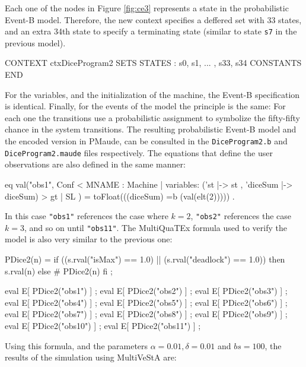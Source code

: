 Each one of the nodes in Figure \ref{fig:ce3} represents a state in the probabilistic Event-B model. Therefore, the new context specifies a deffered set with 33 states, and an extra 34th state to specify a terminating state (similar to state \texttt{s7} in the previous model).
\begin{maude}

CONTEXT ctxDiceProgram2
SETS 
    STATES : { s0, s1, ... , s33, s34 }
CONSTANTS 
END
\end{maude}
For the variables, and the initialization of the machine, the Event-B specification is identical. Finally, for the events of the model the principle is the same: For each one the transitions use a probabilistic assignment to symbolize the fifty-fifty chance in the system transitions. The resulting probabilistic Event-B model and the encoded version in PMaude, can be consulted in the \texttt{DiceProgram2.b} and \texttt{DiceProgram2.maude} files respectively. The equations that define the user observations are also defined in the same manner:
\begin{maude}

eq val("obs1", {Conf < MNAME : Machine | 
                     variables: ('st |-> st , 'diceSum |-> diceSum) >} 
                     {gt | SL}  ) = toFloat(((diceSum) =b (val(elt(2))))) .
\end{maude}
In this case \texttt{"obs1"} references the case where $k = 2$, \texttt{"obs2"} references the case $k = 3$, and so on until \texttt{"obs11"}. The MultiQuaTEx formula used to verify the model is also very similar to the previous one:
\begin{maude2}

PDice2(n) = if ((s.rval("isMax") == 1.0) || (s.rval("deadlock") == 1.0)) 
            then s.rval(n) else # PDice2(n) fi ;

eval E[ PDice2("obs1") ] ;
eval E[ PDice2("obs2") ] ;
eval E[ PDice2("obs3") ] ;
eval E[ PDice2("obs4") ] ;
eval E[ PDice2("obs5") ] ;
eval E[ PDice2("obs6") ] ;
eval E[ PDice2("obs7") ] ;
eval E[ PDice2("obs8") ] ;
eval E[ PDice2("obs9") ] ;
eval E[ PDice2("obs10") ] ;
eval E[ PDice2("obs11") ] ;
\end{maude2}
Using this formula, and the parameters $\alpha = 0.01, \delta = 0.01$ and $bs = 100$, the results of the simulation using MultiVeStA are:

